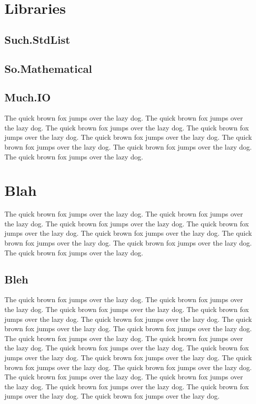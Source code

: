 \documentclass{refcard}
\begin{document}
\section{Libraries}

\subsection{Such.StdList}

\subsection{So.Mathematical}

\subsection{Much.IO}

The quick brown fox jumps over the lazy dog.
The quick brown fox jumps over the lazy dog.
The quick brown fox jumps over the lazy dog.
The quick brown fox jumps over the lazy dog.
The quick brown fox jumps over the lazy dog.
The quick brown fox jumps over the lazy dog.
The quick brown fox jumps over the lazy dog.
The quick brown fox jumps over the lazy dog.

\section{Blah}

The quick brown fox jumps over the lazy dog.
The quick brown fox jumps over the lazy dog.
The quick brown fox jumps over the lazy dog.
The quick brown fox jumps over the lazy dog.
The quick brown fox jumps over the lazy dog.
The quick brown fox jumps over the lazy dog.
The quick brown fox jumps over the lazy dog.
The quick brown fox jumps over the lazy dog.

\subsection{Bleh}

The quick brown fox jumps over the lazy dog.
The quick brown fox jumps over the lazy dog.
The quick brown fox jumps over the lazy dog.
The quick brown fox jumps over the lazy dog.
The quick brown fox jumps over the lazy dog.
The quick brown fox jumps over the lazy dog.
The quick brown fox jumps over the lazy dog.
The quick brown fox jumps over the lazy dog.
The quick brown fox jumps over the lazy dog.
The quick brown fox jumps over the lazy dog.
The quick brown fox jumps over the lazy dog.
The quick brown fox jumps over the lazy dog.
The quick brown fox jumps over the lazy dog.
The quick brown fox jumps over the lazy dog.
The quick brown fox jumps over the lazy dog.
The quick brown fox jumps over the lazy dog.
The quick brown fox jumps over the lazy dog.
The quick brown fox jumps over the lazy dog.
The quick brown fox jumps over the lazy dog.
\end{document}
